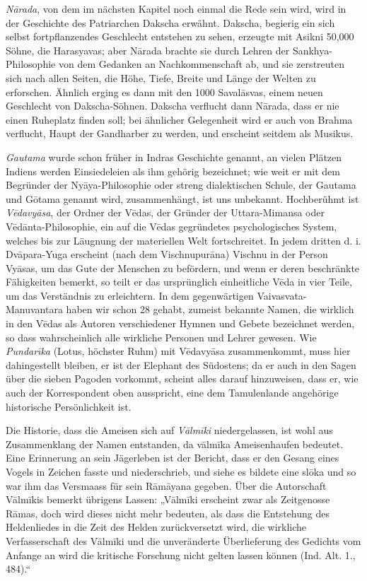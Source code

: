 \documentclass{article}
\begin{document}
\emph{N\={a}rada}, von dem im nächsten Kapitel noch einmal die Rede sein wird, wird in der Geschichte des Patriarchen Dakscha erwähnt. Dakscha, begierig ein sich selbst fortpflanzendes Geschlecht entstehen zu sehen, erzeugte mit Asikni 50,000 Söhne, die Harasyavas; aber N\={a}rada brachte sie durch Lehren der Sankhya-Philosophie von dem Gedanken an Nachkommenschaft ab, und sie zerstreuten sich nach allen Seiten, die Höhe, Tiefe, Breite und Länge der Welten zu erforschen. Ähnlich erging es dann mit den 1000 Saval\={a}svas, einem neuen Geschlecht von Dakscha-Söhnen. Dakscha verflucht dann N\={a}rada, dass er nie einen Ruheplatz finden soll; bei ähnlicher Gelegenheit wird er auch von Brahma verflucht, Haupt der Gandharber zu werden, und erscheint seitdem als Musikus.

\emph{Gautama} wurde schon früher in Indras Geschichte genannt, an vielen Plätzen Indiens werden Einsiedeleien als ihm gehörig bezeichnet; wie weit er mit dem Begründer der Ny\={a}ya-Philosophie oder streng dialektischen Schule, der Gautama und G\={o}tama genannt wird, zusammenhängt, ist uns unbekannt. Hochberühmt ist \emph{V\={e}davy\={a}sa}, der Ordner der V\={e}das, der Gründer der Uttara-Mimansa oder V\={e}d\={a}nta-Philosophie, ein auf die V\={e}das gegründetes psychologisches System, welches bis zur Läugnung der materiellen Welt fortschreitet. In jedem dritten d. i. Dv\={a}para-Yuga erscheint (nach dem Vischnupur\={a}na) Vischnu in der Person Vy\={a}sas, um das Gute der Menschen zu befördern, und wenn er deren beschränkte Fähigkeiten bemerkt, so teilt er das ursprünglich einheitliche V\={e}da in vier Teile, um das Verständnis zu erleichtern. In dem gegenwärtigen Vaivasvata-Manuvantara haben wir schon 28 gehabt, zumeist bekannte Namen, die wirklich in den V\={e}das als Autoren verschiedener Hymnen und Gebete bezeichnet werden, so dass wahrscheinlich alle wirkliche Personen und Lehrer gewesen. Wie \emph{Pundar\={i}ka} (Lotus, höchster Ruhm) mit V\={e}davy\={a}sa zusammenkommt, muss hier dahingestellt bleiben, er ist der Elephant des Südostens; da er auch in den Sagen über die sieben Pagoden vorkommt, scheint alles darauf hinzuweisen, dass er, wie auch der Korrespondent oben ausspricht, eine dem Tamulenlande angehörige historische Persönlichkeit ist.

Die Historie, dass die Ameisen sich auf \emph{V\={a}lm\={i}ki} niedergelassen, ist wohl aus Zusammenklang der Namen entstanden, da v\={a}lm\={i}ka Ameisenhaufen bedeutet. Eine Erinnerung an sein Jägerleben ist der Bericht, dass er den Gesang eines Vogels in Zeichen fasste und niederschrieb, und siehe es bildete eine sl\={o}ka und so war ihm das Versmaass für sein R\={a}m\={a}yana gegeben. Über die Autorschaft V\={a}lm\={i}kis bemerkt übrigens Lassen: „V\={a}lm\={i}ki erscheint zwar als Zeitgenosse R\={a}mas, doch wird dieses nicht mehr bedeuten, als dass die Entstehung des Heldenliedes in die Zeit des Helden zurückversetzt wird, die wirkliche Verfasserschaft des V\={a}lm\={i}ki und die unveränderte Überlieferung des Gedichts vom Anfange an wird die kritische Forschung nicht gelten lassen können (Ind. Alt. 1., 484).“
\end{document}
